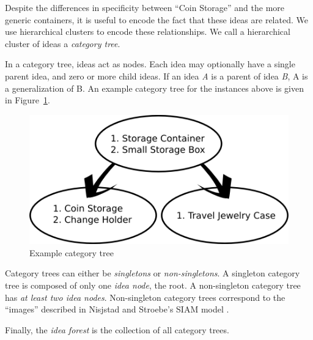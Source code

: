 Despite the differences in specificity between ``Coin Storage'' and the more generic containers, it is useful to encode the fact that these ideas are related. We use hierarchical clusters to encode these relationships. We call a hierarchical cluster of ideas a \emph{category tree}.

In a category tree, ideas act as nodes. Each idea may optionally have a single parent idea, and zero or more child ideas. If an idea \emph{A} is a parent of idea \emph{B}, A is a generalization of B. An example category tree for the instances above is given in Figure~\ref{fig:example_instances}.

\begin{figure}[!h]
    \centering
    \includegraphics[width=0.9\columnwidth]{example_instances}
    \caption{Example category tree}
    \label{fig:example_instances}
\end{figure}

Category trees can either be \emph{singletons} or \emph{non-singletons}. A singleton category tree is composed of only one \emph{idea node}, the root. A non-singleton category tree has \emph{at least two idea nodes}. Non-singleton category trees correspond to the ``images'' described in Nisjstad and Stroebe's SIAM model \cite{nijstad_how_2006}.

Finally, the \emph{idea forest} is the collection of all category trees.



